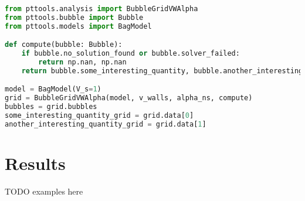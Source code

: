 \begin{lstlisting}[language=Python]
from pttools.analysis import BubbleGridVWAlpha
from pttools.bubble import Bubble
from pttools.models import BagModel

def compute(bubble: Bubble):
	if bubble.no_solution_found or bubble.solver_failed:
		return np.nan, np.nan
	return bubble.some_interesting_quantity, bubble.another_interesting_quantity

model = BagModel(V_s=1)
grid = BubbleGridVWAlpha(model, v_walls, alpha_ns, compute)
bubbles = grid.bubbles
some_interesting_quantity_grid = grid.data[0]
another_interesting_quantity_grid = grid.data[1]
\end{lstlisting}


\section{Results}
TODO examples here

